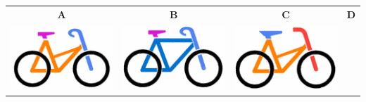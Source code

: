\documentclass[12pt]{article}
\begin{document}
\begin{minipage}{\textwidth}
			\begin{table}[H]
				\begin{tabulary}{\linewidth}{|C|C|C|C|}
					\hline
					\textbf{A} & \textbf{B} & \textbf{C} & \textbf{D} \\
					\includegraphics[width=\linewidth]{option1} &
					\includegraphics[width=\linewidth]{option2} &
					\includegraphics[width=\linewidth]{option3} &

\end{tabulary}
\end{table}
\end{minipage}
\end{document}
